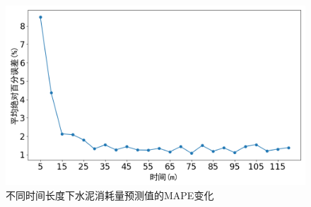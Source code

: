 \begin{figure}
    \centering
    \includegraphics[width=0.8\linewidth]{figures/chapter4/mape.png}
    \caption{不同时间长度下水泥消耗量预测值的MAPE变化}
    \label{fig:cement_mape_evolution}
\end{figure}

